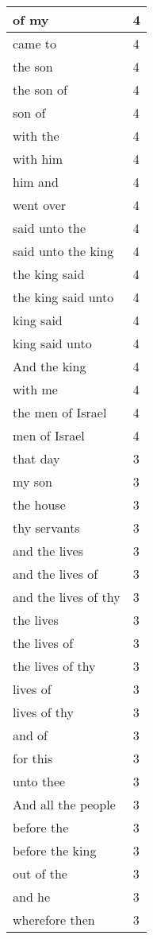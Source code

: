 \begin{center}
\begin{longtable}{|p{3.0in}|p{0.5in}|}
of my & 4\\ \hline 
came to & 4\\ \hline 
the son & 4\\ \hline 
the son of & 4\\ \hline 
son of & 4\\ \hline 
with the & 4\\ \hline 
with him & 4\\ \hline 
him and & 4\\ \hline 
went over & 4\\ \hline 
said unto the & 4\\ \hline 
said unto the king & 4\\ \hline 
the king said & 4\\ \hline 
the king said unto & 4\\ \hline 
king said & 4\\ \hline 
king said unto & 4\\ \hline 
And the king & 4\\ \hline 
with me & 4\\ \hline 
the men of Israel & 4\\ \hline 
men of Israel & 4\\ \hline 
that day & 3\\ \hline 
my son & 3\\ \hline 
the house & 3\\ \hline 
thy servants & 3\\ \hline 
and the lives & 3\\ \hline 
and the lives of & 3\\ \hline 
and the lives of thy & 3\\ \hline 
the lives & 3\\ \hline 
the lives of & 3\\ \hline 
the lives of thy & 3\\ \hline 
lives of & 3\\ \hline 
lives of thy & 3\\ \hline 
and of & 3\\ \hline 
for this & 3\\ \hline 
unto thee & 3\\ \hline 
And all the people & 3\\ \hline 
before the & 3\\ \hline 
before the king & 3\\ \hline 
out of the & 3\\ \hline 
and he & 3\\ \hline 
wherefore then & 3\\ \hline 

\end{longtable}
\end{center}
